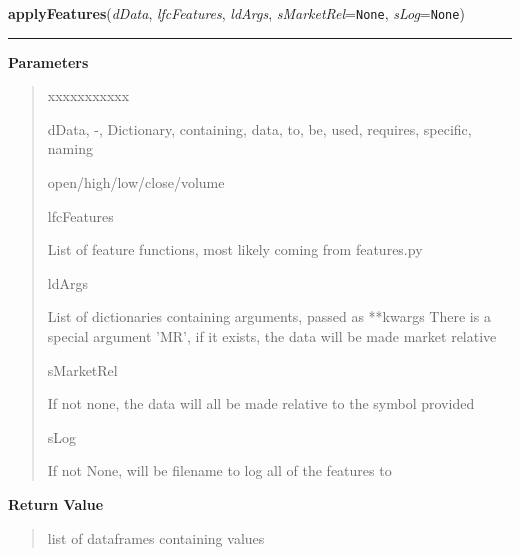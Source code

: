 \hspace{.8\funcindent}\begin{boxedminipage}{\funcwidth}

    \raggedright \textbf{applyFeatures}(\textit{dData}, \textit{lfcFeatures}, \textit{ldArgs}, \textit{sMarketRel}={\tt None}, \textit{sLog}={\tt None})

    \vspace{-1.5ex}

    \rule{\textwidth}{0.5\fboxrule}
\setlength{\parskip}{2ex}
\setlength{\parskip}{1ex}
      \textbf{Parameters}
      \vspace{-1ex}

      \begin{quote}
        \begin{Ventry}{xxxxxxxxxxx}

          \item[dData, -, Dictionary, containing, data, to, be, used, requires, specific, naming]

          open/high/low/close/volume

          \item[lfcFeatures]

          List of feature functions, most likely coming from features.py

          \item[ldArgs]

          List of dictionaries containing arguments, passed as **kwargs 
          There is a special argument 'MR', if it exists, the data will be 
          made market relative

          \item[sMarketRel]

          If not none, the data will all be made relative to the symbol 
          provided

          \item[sLog]

          If not None, will be filename to log all of the features to

        \end{Ventry}

      \end{quote}

      \textbf{Return Value}
    \vspace{-1ex}

      \begin{quote}
      list of dataframes containing values

      \end{quote}

    \end{boxedminipage}

